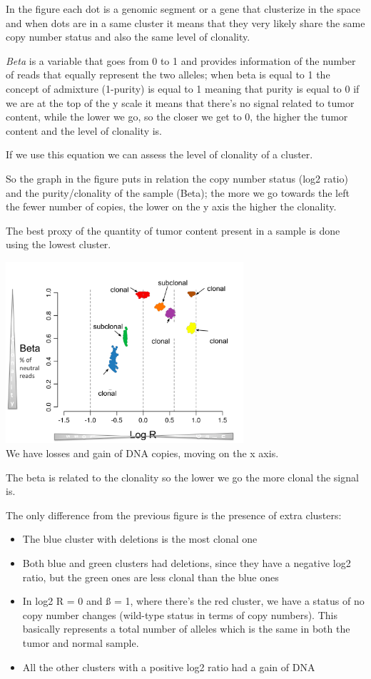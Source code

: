 In the figure each dot is a genomic segment or a gene that clusterize in the
space and when dots are in a same cluster it means that they very likely share
the same copy number status and also the same level of clonality.

\emph{{Beta}} is a variable that goes from 0 to 1 and provides information of
the number of reads that equally represent the two alleles; when beta is equal
to 1 the concept of admixture (1-purity) is equal to 1 meaning that purity is
equal to 0 if we are at the top of the y scale it means that there's no signal
related to tumor content, while the lower we go, so the closer we get to 0, the
higher the tumor content and the level of clonality is.

If we use this equation we can assess the level of clonality of a cluster.

So the graph in the figure puts in relation the copy number status (log2 ratio)
and the purity/clonality of the sample (Beta); the more we go towards the left
the fewer number of copies, the lower on the y axis the higher the clonality.

The best proxy of the quantity of tumor content present in a sample is done
using the lowest cluster.

\includegraphics[width=3.46875in,height=2.65139in]{image2.png}\\

We have losses and
gain of DNA copies, moving on the x axis.

The beta is related to the clonality so the lower we go the more clonal the
signal is.

The only difference from the previous figure is the presence of extra clusters:

\begin{itemize}
\item
  The blue cluster with deletions is the most clonal one
\item
  Both blue and green clusters had deletions, since they have a negative log2
  ratio, but the green ones are less clonal than the blue ones
\item
  In log2 R = 0 and ß = 1, where there's the red cluster, we have a status of no
  copy number changes (wild-type status in terms of copy numbers). This
  basically represents a total number of alleles which is the same in both the
  tumor and normal sample.
\item
  All the other clusters with a positive log2 ratio had a gain of DNA
\end{itemize}


